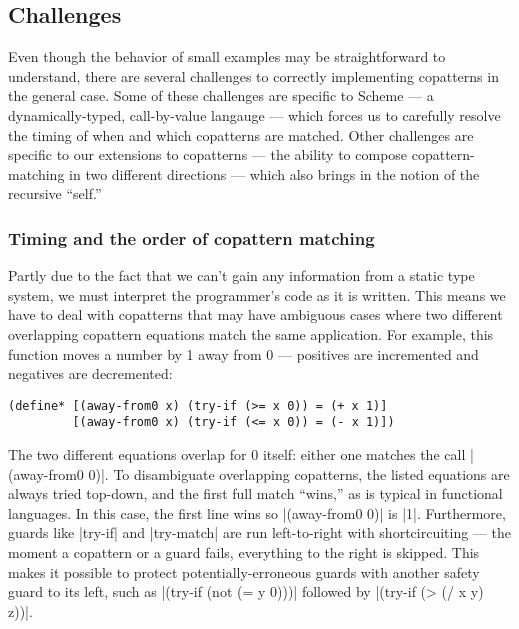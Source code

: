 
\subsection{Challenges}

Even though the behavior of small examples may be straightforward to understand, there are several challenges to correctly implementing copatterns in the general case.
Some of these challenges are specific to Scheme --- a dynamically-typed, call-by-value langauge --- which forces us to carefully resolve the timing of when and which copatterns are matched.
Other challenges are specific to our extensions to copatterns --- the ability to compose copattern-matching in two different directions --- which also brings in the notion of the recursive ``self.''

\subsubsection{Timing and the order of copattern matching}
\label{sec:timing-challenges}

Partly due to the fact that we can't gain any information from a static type system, we must interpret the programmer's code as it is written.
This means we have to deal with copatterns that may have ambiguous cases where two different overlapping copattern equations match the same application.
For example, this function moves a number by 1 away from 0 --- positives are incremented and negatives are decremented:
\begin{verbatim}
(define* [(away-from0 x) (try-if (>= x 0)) = (+ x 1)]
         [(away-from0 x) (try-if (<= x 0)) = (- x 1)])
\end{verbatim}
The two different equations overlap for 0 itself: either one matches the call \scm|(away-from0 0)|.
To disambiguate overlapping copatterns, the listed equations are always tried top-down, and the first full match ``wins,'' as is typical in functional languages.
In this case, the first line wins so \scm|(away-from0 0)| is \scm|1|.
Furthermore, guards like \scm|try-if| and \scm|try-match| are run left-to-right with shortcircuiting --- the moment a copattern or a guard fails, everything to the right is skipped.
This makes it possible to protect potentially-erroneous guards with another safety guard to its left, such as \scm|(try-if (not (= y 0)))| followed by \scm|(try-if (> (/ x y) z))|.

